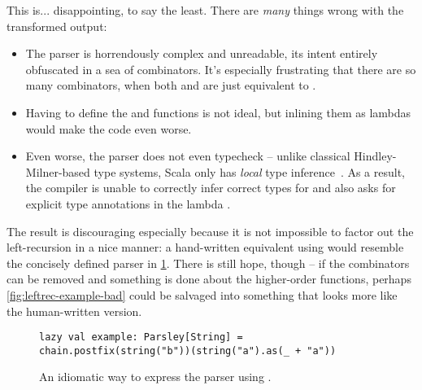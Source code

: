 \documentclass[../../main.tex]{subfiles}
\begin{document}
\noindent %
This is... disappointing, to say the least.
There are \emph{many} things wrong with the transformed output:
\begin{itemize}
  \item The parser is horrendously complex and unreadable, its intent entirely obfuscated in a sea of combinators. It's especially frustrating that there are so many  combinators, when both  and  are just equivalent to .
  \item Having to define the  and  functions is not ideal, but inlining them as lambdas would make the code even worse.
  \item Even worse, the parser does not even typecheck -- unlike classical Hindley-Milner-based type systems, Scala only has \emph{local} type inference~\cite{cremet_core_2006}. As a result, the compiler is unable to correctly infer correct types for  and also asks for explicit type annotations in the lambda .
\end{itemize}
The result is discouraging especially because it is not impossible to factor out the left-recursion in a nice manner:
a hand-written equivalent using  would resemble the concisely defined parser in \cref{fig:leftrec-example-hand}.
There is still hope, though -- if the  combinators can be removed and something is done about the higher-order functions, perhaps \cref{fig:leftrec-example-bad} could be salvaged into something that looks more like the human-written version.

\begin{figure}[htbp]
\begin{verbatim}
lazy val example: Parsley[String] = chain.postfix(string("b"))(string("a").as(_ + "a"))
\end{verbatim}
\caption{An idiomatic way to express the  parser using .}
\label{fig:leftrec-example-hand}
\end{figure}
\end{document}
